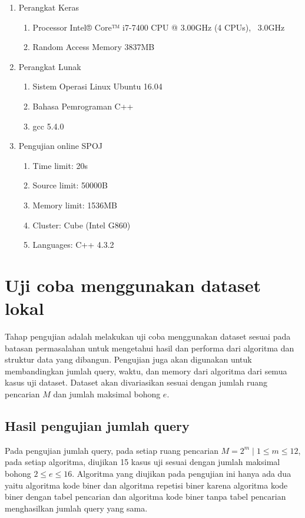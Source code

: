 \begin{enumerate}
  \item Perangkat Keras
  \begin{enumerate}
    \item Processor Intel® Core™ i7-7400 CPU @ 3.00GHz (4 CPUs), ~3.0GHz
    \item Random Access Memory 3837MB
  \end{enumerate}
  \item Perangkat Lunak
  \begin{enumerate}
    \item Sistem Operasi Linux Ubuntu 16.04
    \item Bahasa Pemrograman C++
    \item gcc 5.4.0
  \end{enumerate}
  \item Pengujian online SPOJ
  \begin{enumerate}
    \item Time limit: 20s
    \item Source limit: 50000B
    \item Memory limit: 1536MB
    \item Cluster: Cube (Intel G860)
    \item Languages: C++ 4.3.2
  \end{enumerate}
\end{enumerate}

\section{Uji coba menggunakan dataset lokal}

Tahap pengujian adalah melakukan uji coba menggunakan dataset sesuai pada batasan permasalahan untuk mengetahui hasil dan performa dari algoritma dan struktur data yang dibangun. Pengujian juga akan digunakan untuk membandingkan jumlah query, waktu, dan memory dari algoritma dari semua kasus uji dataset. Dataset akan divariasikan sesuai dengan jumlah ruang pencarian $M$ dan jumlah maksimal bohong $e$.

\subsection{Hasil pengujian jumlah query}

Pada pengujian jumlah query, pada setiap ruang pencarian $M=2^m \mid 1 \leq m \leq 12$, pada setiap algoritma, diujikan 15 kasus uji sesuai dengan jumlah maksimal bohong $2 \leq e \leq 16$. Algoritma yang diujikan pada pengujian ini hanya ada dua yaitu algoritma kode biner dan algoritma repetisi biner karena algoritma kode biner dengan tabel pencarian dan algoritma kode biner tanpa tabel pencarian menghasilkan jumlah query yang sama.

